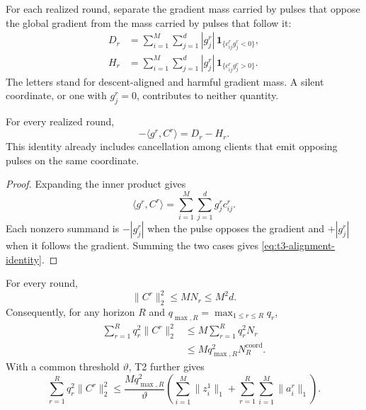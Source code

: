 For each realized round, separate the gradient mass carried by pulses that
oppose the global gradient from the mass carried by pulses that follow it:
\begin{align}
    D_r
    &=
    \sum_{i=1}^{M}\sum_{j=1}^{d}
    |g_j^r|\,\mathbf{1}_{\{c_{ij}^rg_j^r<0\}},
    \label{eq:t3-descent-mass}\\
    H_r
    &=
    \sum_{i=1}^{M}\sum_{j=1}^{d}
    |g_j^r|\,\mathbf{1}_{\{c_{ij}^rg_j^r>0\}}.
    \label{eq:t3-harmful-mass}
\end{align}
The letters stand for descent-aligned and harmful gradient mass.  A silent
coordinate, or one with $g_j^r=0$, contributes to neither quantity.

\begin{proposition}
\label{prop:t3-alignment-identity}
For every realized round,
\begin{equation}
    -\langle g^r,C^r\rangle=D_r-H_r.
    \label{eq:t3-alignment-identity}
\end{equation}
This identity already includes cancellation among clients that emit opposing
pulses on the same coordinate.
\end{proposition}

\begin{proof}
Expanding the inner product gives
\begin{equation}
    \langle g^r,C^r\rangle
    =\sum_{i=1}^{M}\sum_{j=1}^{d}g_j^rc_{ij}^r.
\end{equation}
Each nonzero summand is $-|g_j^r|$ when the pulse opposes the gradient and
$+|g_j^r|$ when it follows the gradient.  Summing the two cases gives
\eqref{eq:t3-alignment-identity}.
\end{proof}

\begin{lemma}
\label{lem:t3-event-energy}
For every round,
\begin{equation}
    \|C^r\|_2^2\leq MN_r\leq M^2d.
    \label{eq:t3-event-energy}
\end{equation}
Consequently, for any horizon $R$ and $q_{\max,R}=\max_{1\leq r\leq R}q_r$,
\begin{align}
    \sum_{r=1}^{R}q_r^2\|C^r\|_2^2
    &\leq
    M\sum_{r=1}^{R}q_r^2N_r
    \label{eq:t3-weighted-event-energy}\\
    &\leq
    Mq_{\max,R}^2N_R^{\mathrm{coord}}.
    \label{eq:t3-event-energy-cumulative}
\end{align}
With a common threshold $\vartheta$, T2 further gives
\begin{equation}
    \sum_{r=1}^{R}q_r^2\|C^r\|_2^2
    \leq
    \frac{Mq_{\max,R}^2}{\vartheta}
    \left(
      \sum_{i=1}^{M}\|z_i^1\|_1
      +\sum_{r=1}^{R}\sum_{i=1}^{M}\|a_i^r\|_1
    \right).
    \label{eq:t3-energy-evidence-budget}
\end{equation}
\end{lemma}

